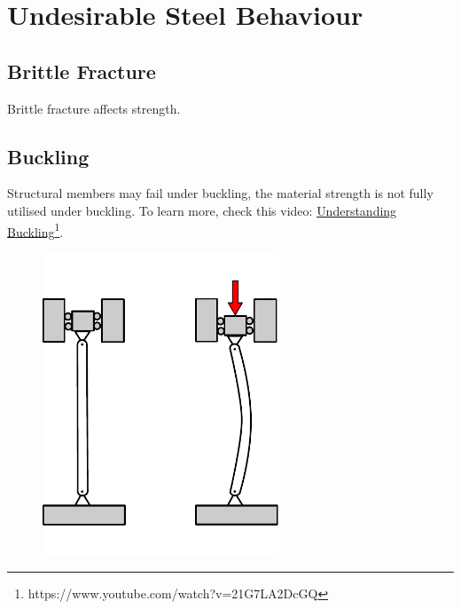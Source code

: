 \section{Undesirable Steel Behaviour}
\subsection{Brittle Fracture}
Brittle fracture affects strength.
\begin{figure}[H]
\centering

\end{figure}
\subsection{Buckling}
Structural members may fail under buckling, the material strength is not fully utilised under buckling. To learn more, check this video: \href{https://www.youtube.com/watch?v=21G7LA2DcGQ}{Understanding Buckling}\footnote{https://www.youtube.com/watch?v=21G7LA2DcGQ}.
\begin{figure}[H]
\centering\includegraphics[height=9cm]{PIC/CH04/BUCKLING}
\end{figure}
